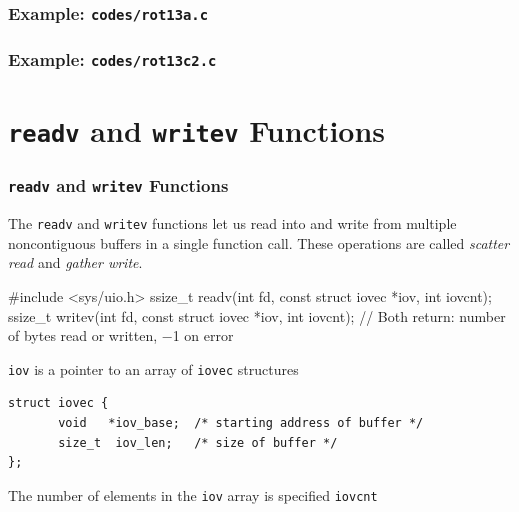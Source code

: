 \documentclass[newPxFont,sthlmFooter,nooffset]{beamer}
\begin{document}
\begin{frame}
  \frametitle{Example: \texttt{codes/rot13a.c}}
  

\end{frame}


\begin{frame}
  \frametitle{Example: \texttt{codes/rot13c2.c}}
  

\end{frame}


\section{\texttt{readv} and \texttt{writev} Functions}

\begin{frame}[t, fragile]
  \frametitle{\texttt{readv} and \texttt{writev} Functions}
The \texttt{readv} and \texttt{writev} functions let us read into and write from multiple noncontiguous buffers in a single function call. These operations are called \textit{scatter read} and \textit{gather write}.
\begin{codedef}
#include <sys/uio.h>
ssize_t readv(int fd, const struct iovec *iov, int iovcnt);
ssize_t writev(int fd, const struct iovec *iov, int iovcnt);
// Both return: number of bytes read or written, −1 on error
\end{codedef}

\texttt{iov} is a pointer to an array of \texttt{iovec} structures
{\footnotesize
\begin{verbatim}
struct iovec {
       void   *iov_base;  /* starting address of buffer */
       size_t  iov_len;   /* size of buffer */
};
\end{verbatim}
}

The number of elements in the \texttt{iov} array is specified \texttt{iovcnt}
\end{frame}
\end{document}
